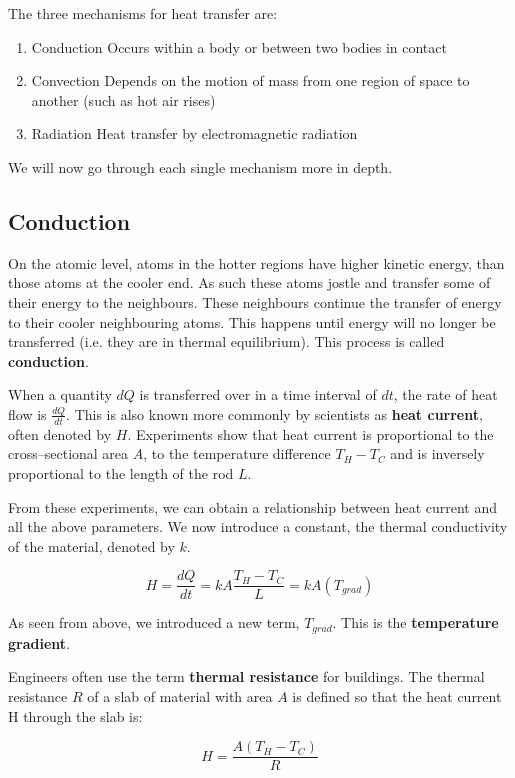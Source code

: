 The three mechanisms for heat transfer are:
\begin{enumerate}
\item Conduction
\subitem Occurs within a body or between two bodies in contact
\item Convection
\subitem Depends on the motion of mass from one region of space to another (such as hot air rises)
\item Radiation
\subitem Heat transfer by electromagnetic radiation
\end{enumerate}

We will now go through each single mechanism more in depth.

\subsection{Conduction}
On the atomic level, atoms in the hotter regions have higher kinetic energy, than those atoms at the cooler end. As such these atoms jostle and transfer some of their energy to the neighbours. These neighbours continue the transfer of energy to their cooler neighbouring atoms. This happens until energy will no longer be transferred (i.e. they are in thermal equilibrium). This process is called \textbf{conduction}.

When a quantity $dQ$ is transferred over in a time interval of $dt$, the rate of heat flow is $\frac{dQ}{dt}$. This is also known more commonly by scientists as \textbf{heat current}, often denoted by $H$. Experiments show that heat current is proportional to the cross--sectional area $A$, to the temperature difference $T_H - T_C$ and is inversely proportional to the length of the rod $L$.

From these experiments, we can obtain a relationship between heat current and all the above parameters. We now introduce a constant, the thermal conductivity of the material, denoted by $k$.

\begin{form}
$$H=\frac{dQ}{dt}=kA\frac{T_H-T_C}{L}=kA\left(T_{grad}\right)$$
\end{form}

As seen from above, we introduced a new term, $T_{grad}$. This is the \textbf{temperature gradient}.

Engineers often use the term \textbf{thermal resistance} for buildings. The thermal resistance $R$ of a slab of material with area $A$ is defined so that the heat current H through the slab is:
\begin{defi}
$$H=\frac{A\left(T_H-T_C\right)}{R}$$
\end{defi}

